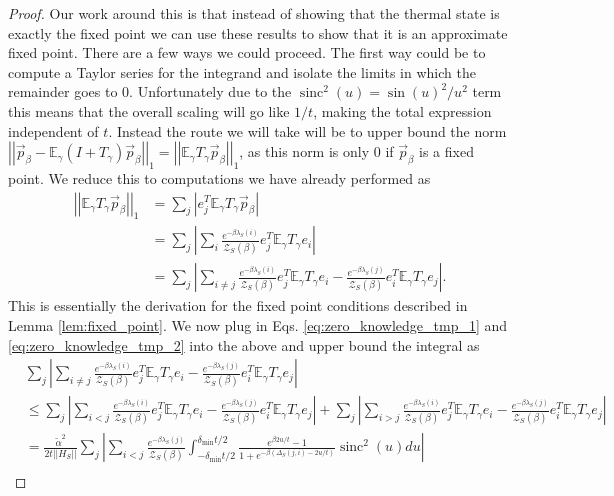 \documentclass[
 amsmath,amssymb,
 aps,
onecolumn, 
nofootinbib]{revtex4-2}
\newcommand{\abs}[1]{\left| #1 \right|}
\newcommand{\norm}[1]{\left|\left| #1 \right|\right|}
\newcommand{\EE}{\mathbb{E}}
\newcommand{\partfun}{\mathcal{Z}}
\DeclareMathOperator{\sinc}{sinc}
\begin{document}
\begin{proof}
    Our work around this is that instead of showing that the thermal state is exactly the fixed point we can use these results to show that it is an approximate fixed point. There are a few ways we could proceed. The first way could be to compute a Taylor series for the integrand and isolate the limits in which the remainder goes to 0. Unfortunately due to the $\sinc^2(u) = \sin(u)^2 / u^2$ term this means that the overall scaling will go like $1/t$, making the total expression independent of $t$. Instead the route we will take will be to upper bound the norm $\norm{\vec{p}_{\beta} - \EE_\gamma (I + T_\gamma)\vec{p}_\beta}_1 = \norm{\EE_\gamma T_\gamma \vec{p}_\beta}_1$, as this norm is only 0 if $\vec{p}_\beta$ is a fixed point. We reduce this to computations we have already performed as
    \begin{align}
        \norm{\EE_\gamma T_\gamma \vec{p}_\beta}_1 &= \sum_j \abs{e_j^T \EE_\gamma T_\gamma \vec{p}_\beta } \\
        &= \sum_j \abs{\sum_{i} \frac{e^{-\beta \lambda_S(i)}}{\partfun_S(\beta)} e_j^T \EE_\gamma T_\gamma e_i } \\
        &= \sum_j \abs{\sum_{i \neq j} \frac{e^{-\beta \lambda_S(i)}}{\partfun_S(\beta)} e_j^T \EE_\gamma T_\gamma e_i - \frac{e^{-\beta \lambda_S(j)}}{\partfun_S(\beta)} e_i^T \EE_\gamma T_\gamma e_j}.
    \end{align}
    This is essentially the derivation for the fixed point conditions described in Lemma \ref{lem:fixed_point}. We now plug in Eqs. \eqref{eq:zero_knowledge_tmp_1} and \eqref{eq:zero_knowledge_tmp_2} into the above and upper bound the integral as
    \begin{align}
        &\sum_j \abs{\sum_{i \neq j} \frac{e^{-\beta \lambda_S(i)}}{\partfun_S(\beta)} e_j^T \EE_\gamma T_\gamma e_i - \frac{e^{-\beta \lambda_S(j)}}{\partfun_S(\beta)} e_i^T \EE_\gamma T_\gamma e_j} \nonumber \\
        &\le \sum_j \abs{\sum_{i < j} \frac{e^{-\beta \lambda_S(i)}}{\partfun_S(\beta)} e_j^T \EE_\gamma T_\gamma e_i - \frac{e^{-\beta \lambda_S(j)}}{\partfun_S(\beta)} e_i^T \EE_\gamma T_\gamma e_j} + \sum_j  \abs{\sum_{i > j} \frac{e^{-\beta \lambda_S(i)}}{\partfun_S(\beta)} e_j^T \EE_\gamma T_\gamma e_i - \frac{e^{-\beta \lambda_S(j)}}{\partfun_S(\beta)} e_i^T \EE_\gamma T_\gamma e_j} \\
        &= \frac{\widetilde{\alpha}^2}{2 t \norm{H_S}} \sum_j \abs{\sum_{i < j} \frac{e^{-\beta \lambda_S(j)}}{\partfun_S(\beta)} \int_{-\delta_{\min} t /2 }^{\delta_{\min} t/ 2} \frac{ e^{\beta 2 u / t} - 1}{1 + e^{-\beta(\Delta_S(j, i) - 2u/t)}} \sinc^2(u) du} \nonumber \\

\end{align}
\end{proof}
\end{document}
